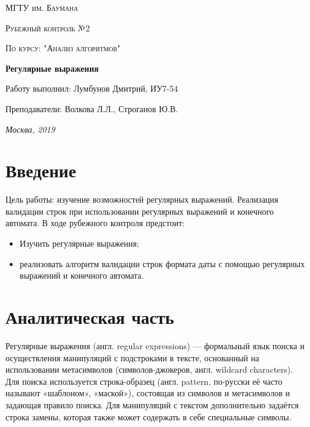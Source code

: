 \documentclass[12pt]{report}
\begin{document}
\begin{titlepage}
	\centering
	{\scshape\LARGE МГТУ им. Баумана \par}
	\vspace{3cm}
	{\scshape\Large Рубежный контроль №2\par}
	\vspace{0.5cm}	
	{\scshape\Large По курсу: "Анализ алгоритмов"\par}
	\vspace{1.5cm}
	{\huge\bfseries Регулярные выражения \par}
	\vspace{2cm}
	\Large Работу выполнил: Лумбунов Дмитрий, ИУ7-54\par
	\vspace{0.5cm}
	\Large Преподаватели:  Волкова Л.Л., Строганов Ю.В.\par

	\vfill
	\large \textit {Москва, 2019} \par
\end{titlepage}

\tableofcontents

\newpage
\chapter*{Введение}

Цель работы: изучение возможностей регулярных выражений. Реализация валидации строк при использовании регулярных выражений и конечного автомата.
В ходе рубежного контроля предстоит:
\begin{itemize}
	\item Изучить регулярные выражения; 
	\item реализовать алгоритм валидации строк формата даты с помощью регулярных выражений и конечного автомата.
\end{itemize}

\chapter{Аналитическая часть}
Регулярные выражения (англ. regular expressions) — формальный язык поиска и осуществления манипуляций с подстроками в тексте, основанный на использовании метасимволов (символов-джокеров, англ. wildcard characters). Для поиска используется строка-образец (англ. pattern, по-русски её часто называют «шаблоном», «маской»), состоящая из символов и метасимволов и задающая правило поиска. Для манипуляций с текстом дополнительно задаётся строка замены, которая также может содержать в себе специальные символы.
\end{document}
